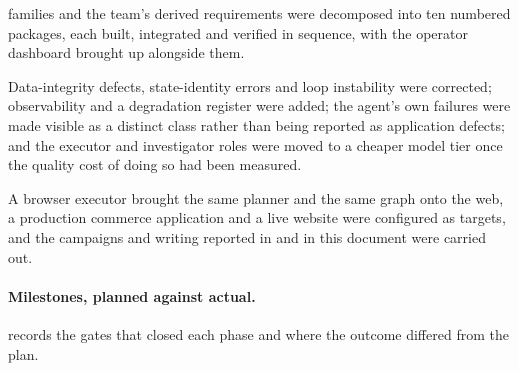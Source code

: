 \begin{description}[leftmargin=2.2em,style=nextline]
    families and the team's derived requirements were decomposed into ten
    numbered packages, each built, integrated and verified in sequence, with
    the operator dashboard brought up alongside them.
  \item[P5. Reliability and fault attribution (August 2026).] Data-integrity
    defects, state-identity errors and loop instability were corrected;
    observability and a degradation register were added; the agent's own
    failures were made visible as a distinct class rather than being reported
    as application defects; and the executor and investigator roles were moved
    to a cheaper model tier once the quality cost of doing so had been
    measured.
  \item[P6. Second platform, evaluation and report (September 2026).] A browser
    executor brought the same planner and the same graph onto the web, a
    production commerce application and a live website were configured as
    targets, and the campaigns and writing reported in  and
    in this document were carried out.
\end{description}

\paragraph{Milestones, planned against actual.}  records
the gates that closed each phase and where the outcome differed from the plan.

